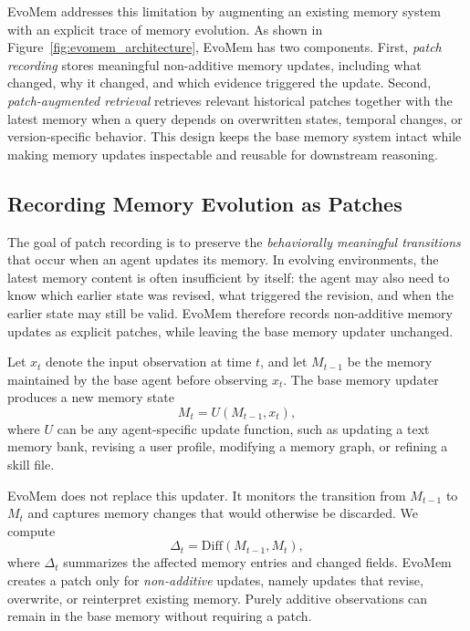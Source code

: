 \documentclass{llmxive}
\begin{document}
EvoMem addresses this limitation by augmenting an existing memory system with an explicit trace of memory evolution. As shown in Figure~\ref{fig:evomem_architecture}, EvoMem has two components. First, \emph{patch recording} stores meaningful non-additive memory updates, including what changed, why it changed, and which evidence triggered the update. Second, \emph{patch-augmented retrieval} retrieves relevant historical patches together with the latest memory when a query depends on overwritten states, temporal changes, or version-specific behavior. This design keeps the base memory system intact while making memory updates inspectable and reusable for downstream reasoning.







\subsection{Recording Memory Evolution as Patches}
\label{sec:patch_record}

The goal of patch recording is to preserve the \emph{behaviorally meaningful transitions} that occur when an agent updates its memory. In evolving environments, the latest memory content is often insufficient by itself: the agent may also need to know which earlier state was revised, what triggered the revision, and when the earlier state may still be valid. EvoMem therefore records non-additive memory updates as explicit patches, while leaving the base memory updater unchanged.

Let $x_t$ denote the input observation at time $t$, and let $M_{t-1}$ be the memory maintained by the base agent before observing $x_t$. The base memory updater produces a new memory state
\[
M_t = U(M_{t-1}, x_t),
\]
where $U$ can be any agent-specific update function, such as updating a text memory bank, revising a user profile, modifying a memory graph, or refining a skill file.

EvoMem does not replace this updater. It monitors the transition from $M_{t-1}$ to $M_t$ and captures memory changes that would otherwise be discarded. We compute
\[
\Delta_t = \mathrm{Diff}(M_{t-1}, M_t),
\]
where $\Delta_t$ summarizes the affected memory entries and changed fields. EvoMem creates a patch only for \emph{non-additive} updates, namely updates that revise, overwrite, or reinterpret existing memory. Purely additive observations can remain in the base memory without requiring a patch.
\end{document}
